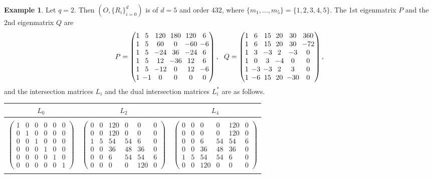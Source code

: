 \documentclass[11pt]{amsart}
\newcommand{\pmat}[1]{\begin{pmatrix} #1 \end{pmatrix}}
\theoremstyle{plain} %
\theoremstyle{definition} %
\newtheorem{ex}[thm]{Example} %
\theoremstyle{remark} %
\begin{document}
\begin{ex}\label{con2ex1}%
Let $q=2$. Then $\left(O,\{R_i\}_{i=0}^d\right)$ is of $d=5$ and order $432$, where $\{m_1,\dots,m_5\}=\{1,2,3,4,5\}$. The 1st eigenmatrix $P$ and the 2nd eigenmatrix $Q$ are
$$
\setlength{\arraycolsep}{2pt}
P=\pmat{
1&5&120&180&120&6\\
1&5&60&0&-60&-6\\
1&5& -24&36&-24&6\\
1&5&12&-36&12&6\\
1&5&-12&0&12&-6\\
1&-1&0&0&0&0
}
,
\ \ 
Q=\pmat{
1&6&15&20&30&360\\
1&6&15&20&30&-72\\
1&3&-3&2&-3&0\\
1&0&3&-4&0&0\\
1&-3&-3&2&3&0\\
1&-6&15&20&-30&0
},
$$
and the intersection matrices $L_i$ and the dual intersection matrices $L_i^*$ are as follows.
\begin{table}[H]
  \setlength{\arraycolsep}{1.5pt}
\renewcommand{\arraystretch}{0.8}
  \begin{center}
      \begin{tabular}{ccc}
      \\
           $L_0$&$L_2$&$L_4$\\
\hline%
\\
$\pmat{1&0&0&0&0&0\\0&1&0&0&0&0\\0&0&1&0&0&0\\0&0&0&1&0&0\\0&0&0&0&1&0\\0&0&0&0&0&1}$&$\pmat{0 & 0 & 120 & 0 & 0 & 0 \\
0 & 0 & 120 & 0 & 0 & 0 \\
1 & 5 & 54 & 54 & 6 & 0 \\
0 & 0 & 36 & 48 & 36 & 0 \\
0 & 0 & 6 & 54 & 54 & 6 \\
0 & 0 & 0 & 0 & 120 & 0}$&$
\pmat{0 & 0 & 0 & 0 & 120 & 0 \\
0 & 0 & 0 & 0 & 120 & 0 \\
0 & 0 & 6 & 54 & 54 & 6 \\
0 & 0 & 36 & 48 & 36 & 0 \\
1 & 5 & 54 & 54 & 6 & 0 \\
0 & 0 & 120 & 0 & 0 & 0}$\\
\\

\end{tabular}
\end{center}
\end{table}
\end{ex}
\end{document}
